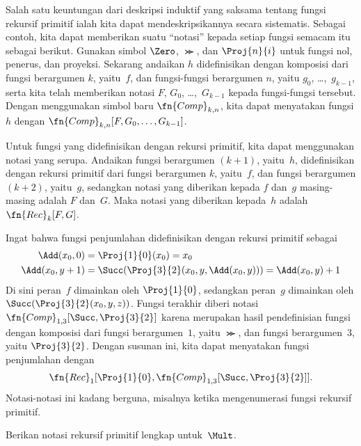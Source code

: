 \documentclass[../../../include/open-logic-section]{subfiles}
\begin{document}

Salah satu keuntungan dari deskripsi induktif yang saksama tentang fungsi
rekursif primitif ialah kita dapat mendeskripsikannya secara sistematis.
Sebagai contoh, kita dapat memberikan suatu ``notasi'' kepada setiap fungsi
semacam itu sebagai berikut. Gunakan simbol $\Zero$, $\Succ$, dan
$\Proj{n}{i}$ untuk fungsi nol, penerus, dan proyeksi. Sekarang andaikan $h$
didefinisikan dengan komposisi dari fungsi berargumen $k$, yaitu~$f$, dan
fungsi-fungsi berargumen $n$, yaitu $g_0$, \dots,~$g_{k-1}$, serta kita telah
memberikan notasi $F$, $G_0$, \dots,~$G_{k-1}$ kepada fungsi-fungsi tersebut.
Dengan menggunakan simbol baru $\fn{Comp}_{k,n}$, kita dapat menyatakan fungsi
$h$ dengan $\fn{Comp}_{k,n}[F,G_0,\dots,G_{k-1}]$.

Untuk fungsi yang didefinisikan dengan rekursi primitif, kita dapat menggunakan
notasi yang serupa. Andaikan fungsi berargumen $(k+1)$, yaitu~$h$,
didefinisikan dengan rekursi primitif dari fungsi berargumen $k$, yaitu~$f$,
dan fungsi berargumen $(k+2)$, yaitu~$g$, sedangkan notasi yang diberikan
kepada $f$ dan~$g$ masing-masing adalah $F$ dan~$G$. Maka notasi yang diberikan
kepada~$h$ adalah $\fn{Rec}_k[F,G]$.

Ingat bahwa fungsi penjumlahan didefinisikan dengan rekursi primitif sebagai
\begin{align*}
  \Add(x_0, 0) & = \Proj{1}{0}(x_0) = x_0\\
  \Add(x_0, y+1) & = \Succ(\Proj{3}{2}(x_0, y, \Add(x_0, y))) = \Add(x_0, y) +1
\end{align*}
Di sini peran~$f$ dimainkan oleh $\Proj{1}{0}$, sedangkan peran~$g$ dimainkan
oleh $\Succ(\Proj{3}{2}(x_0, y, z))$. Fungsi terakhir diberi notasi
$\fn{Comp}_{1,3}[\Succ,\Proj{3}{2}]$ karena merupakan hasil pendefinisian
fungsi dengan komposisi dari fungsi berargumen~$1$, yaitu $\Succ$, dan fungsi
berargumen~$3$, yaitu $\Proj{3}{2}$. Dengan susunan ini, kita dapat menyatakan fungsi
penjumlahan dengan
\[
\fn{Rec}_1[\Proj{1}{0},\fn{Comp}_{1,3}[\Succ,\Proj{3}{2}]].
\]
Notasi-notasi ini kadang berguna, misalnya ketika mengenumerasi fungsi
rekursif primitif.

\begin{prob}
  Berikan notasi rekursif primitif lengkap untuk~$\Mult$.
\end{prob}
\end{document}
